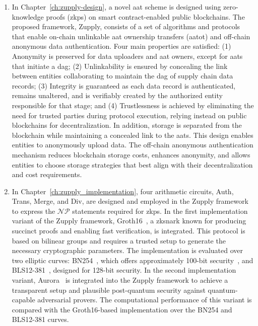 \begin{enumerate}
\item  In Chapter~\ref{ch:zupply-design}, a novel \gls{aat} scheme is designed using zero-knowledge proofs (\glspl{zkp}) on smart contract-enabled public blockchains. The proposed framework, Zupply, consists of a set of algorithms and protocols that enable on-chain unlinkable \gls{aat} ownership transfers (\gls{aatot}) and off-chain anonymous data authentication. Four main properties are satisfied: (1) Anonymity is preserved for data uploaders and \gls{aat} owners, except for \glspl{aat} that initiate a \gls{dag}; (2) Unlinkability is ensured by concealing the link between entities collaborating to maintain the \gls{dag} of supply chain data records; (3) Integrity is guaranteed as each data record is authenticated, remains unaltered, and is verifiably created by the authorized entity responsible for that stage; and (4) Trustlessness is achieved by eliminating the need for trusted parties during protocol execution, relying instead on public blockchains for decentralization. In addition, storage is separated from the blockchain while maintaining a concealed link to the \glspl{aat}. This design enables entities to anonymously upload data. The off-chain anonymous authentication mechanism reduces blockchain storage costs, enhances anonymity, and allows entities to choose storage strategies that best align with their decentralization and cost requirements.

\item In Chapter~\ref{ch:zupply_implementation}, four arithmetic circuits, \textsf{Auth}, \textsf{Trans}, \textsf{Merge}, and \textsf{Div}, are designed and employed in the Zupply framework to express the $\mathcal{NP}$ statements required for \glspl{zkp}. In the first implementation variant of the Zupply framework, Groth16~\cite{Groth2016}, a \gls{zksnark} known for producing succinct proofs and enabling fast verification, is integrated. This protocol is based on bilinear groups and requires a trusted setup to generate the necessary cryptographic parameters. The implementation is evaluated over two elliptic curves: BN254~\cite{BNcurve}, which offers approximately 100-bit security~\cite{Barbulescu2019}, and BLS12-381~\cite{BLS_curve2003}, designed for 128-bit security. In the second implementation variant, Aurora~\cite{Aurora2019} is integrated into the Zupply framework to achieve a transparent setup and plausible post-quantum security against quantum-capable adversarial provers. The computational performance of this variant is compared with the Groth16-based implementation over the BN254 and BLS12-381 curves.

\end{enumerate}

    